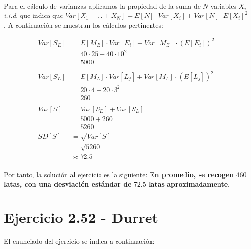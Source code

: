 \documentclass[a4paper, spanish]{article}
\begin{document}
    \paragraph{}
    Para el cálculo de varianzas aplicamos la propiedad de la suma de $N$ variables $X_i$ \emph{i.i.d}, que indica que $Var[X_1 + ... + X_N] = E[N] \cdot Var[X_i] + Var[N] \cdot E[X_i]^2$. A continuación se muestran los cálculos pertinentes:

    \begin{align*}
      Var[S_E]
      &= E[M_E] \cdot Var[E_i] + Var[M_E] \cdot (E[E_i])^2 \\
      &= 40 \cdot 25 + 40 \cdot 10 ^ 2 \\
      &= 5000\\
      \\
      Var[S_L]
      &= E[M_L] \cdot Var[L_j] + Var[M_L] \cdot (E[L_j])^2 \\
      &= 20  \cdot 4 + 20 \cdot 3 ^ 2\\
      &= 260 \\ 
      \\
      Var[S]
      &= Var[S_E] + Var[S_L] \\
      &= 5000 + 260 \\
      &= 5260
      \\
      SD[S]
      &= \sqrt{Var[S]} \\
      &= \sqrt{5260} \\
      &\approx 72.5
    \end{align*}

    \paragraph{}
    Por tanto, la solución al ejercicio es la siguiente: \textbf{En promedio, se recogen $460$ latas, con una desviación estándar de $72.5$ latas aproximadamente}.

  \section{Ejercicio 2.52 - Durret}

  \paragraph{}
  El enunciado del ejercicio se indica a continuación:

  \begin{displayquote}
  \end{displayquote}
\end{document}
